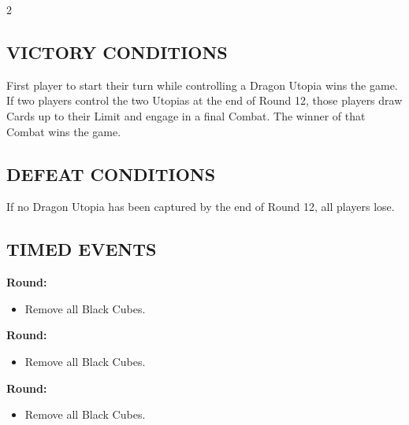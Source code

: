 \begin{multicols}{2}
\subsection*{\MakeUppercase{Victory Conditions}}
First player to start their turn while controlling a Dragon Utopia wins the game. If two players control the two Utopias at the end of Round 12, those players draw Cards up to their  Limit and engage in a final Combat. The winner of that Combat wins the game.

\subsection*{\MakeUppercase{Defeat Conditions}}
If no Dragon Utopia has been captured by the end of Round 12, all players lose.

\subsection*{\MakeUppercase{Timed Events}}
\textbf{ Round:}
\begin{itemize}
  \item Remove all Black Cubes.
\end{itemize}
\textbf{ Round:}
\begin{itemize}
  \item Remove all Black Cubes.
\end{itemize}
\textbf{ Round:}
\begin{itemize}
  \item Remove all Black Cubes.
\end{itemize}


\end{multicols}
